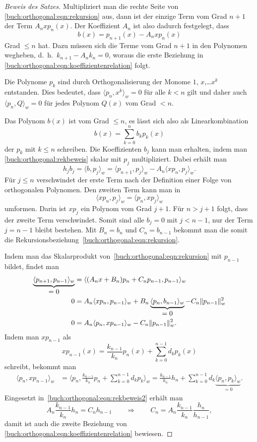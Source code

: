\begin{proof}[Beweis des Satzes]
Multipliziert man die rechte Seite von
\eqref{buch:orthogonal:eqn:rekursion} aus, dann ist der einzige Term
vom Grad $n+1$ der Term $A_nxp_n(x)$.
Der Koeffizient $A_n$ ist also dadurch festgelegt, dass
\begin{equation}
b(x)
=
p_{n+1}(x) - A_nxp_n(x)
\label{buch:orthogonal:rekbeweis}
\end{equation}
Grad $\le n$ hat.
Dazu müssen sich die Terme vom Grad $n+1$ in den Polynomen wegheben,
d.~h.~$k_{n+1}-A_nk_n=0$, woraus die erste Beziehung in
\eqref{buch:orthogonal:eqn:koeffizientenrelation} folgt.

Die Polynome $p_k$ sind durch Orthogonalisierung der Monome
$1$, $x$,\dots $x^{k}$ entstanden.
Dies bedeutet, dass $\langle p_n,x^k\rangle_w=0$ für alle $k<n$
gilt und daher auch $\langle p_n,Q\rangle_w=0$ für jedes Polynom
$Q(x)$ vom Grad $<n$.

Das Polynom $b(x)$ ist vom Grad $\le n$, es lässt sich also als
Linearkombination
\[
b(x) = \sum_{k=0}^n b_k p_k(x)
\]
der $p_k$ mit $k\le n$ schreiben.
Die Koeffizienten $b_j$ kann man erhalten, indem man 
\eqref{buch:orthogonal:rekbeweis} skalar mit $p_j$ multipliziert.
Dabei erhält man
\[
h_jb_j
=
\langle b,p_j\rangle_w
=
\langle p_{n+1},p_j\rangle_w
-
A_n\langle xp_n,p_j\rangle_w.
\]
Für $j\le n$ verschwindet der erste Term nach der Definition einer
Folge von orthogonalen Polynomen.
Den zweiten Term kann man in
\[
\langle xp_n,p_j\rangle_w
=
\langle p_n,xp_j\rangle_w
\]
umformen.
Darin ist $xp_j$ ein Polynom vom Grad $j+1$.
Für $n>j+1$ folgt, dass der zweite Term verschwindet.
Somit sind alle $b_j=0$ mit $j<n-1$, nur der Term $j=n-1$
bleibt bestehen.
Mit $B_n=b_n$ und $C_n=b_{n-1}$ bekommt man die somit die
Rekursionsbeziehung~\eqref{buch:orthogonal:eqn:rekursion}.

Indem man das Skalarprodukt von~\eqref{buch:orthogonal:eqn:rekursion}
mit $p_{n-1}$ bildet, findet man
\begin{align}
\underbrace{\langle
p_{n+1},p_{n-1}
\rangle_w}_{\displaystyle=0}
&=
\langle (A_nx+B_n)p_n+C_np_{n-1},p_{n-1} \rangle_w
\notag
\\
0
&=
A_n\langle xp_n,p_{n-1} \rangle_w
+B_n\underbrace{\langle p_n,b_{n-1}\rangle_w}_{\displaystyle=0}
-C_n\|p_{n-1}\|_w^2
\notag
\\
0
&=
A_n\langle p_n,xp_{n-1} \rangle_w
-C_n\|p_{n-1}\|_w^2.
\label{buch:orthogonal:eqn:rekbeweis2}
\end{align}
Indem man $xp_{n-1}$ als
\[
xp_{n-1}(x)
=
\frac{k_{n-1}}{k_n} p_n(x)
+
\sum_{k=0}^{n-1} d_kp_k(x)
\]
schreibt, bekommt man
\begin{align*}
\langle
p_n,
xp_{n-1}
\rangle_w
&=
\biggl\langle
p_n,
\frac{k_{n-1}}{k_n} p_n
+
\sum_{k=0}^{n-1} d_kp_k
\biggr\rangle_w
=
\frac{k_{n-1}}{k_n}h_n
+
\sum_{k=0}^{n-1} d_k\underbrace{\langle p_n,p_k\rangle_w}_{\displaystyle=0}.
\end{align*}
Eingesetzt in~\eqref{buch:orthogonal:eqn:rekbeweis2} erhält man
\[
A_n\frac{k_{n-1}}{k_n}h_n = C_n h_{n-1}
\qquad\Rightarrow\qquad
C_n
=
A_n\frac{k_{n-1}}{k_n}\frac{h_n}{h_{n-1}},
\]
damit ist auch die zweite Beziehung von
\eqref{buch:orthogonal:eqn:koeffizientenrelation}
bewiesen.
\end{proof}
